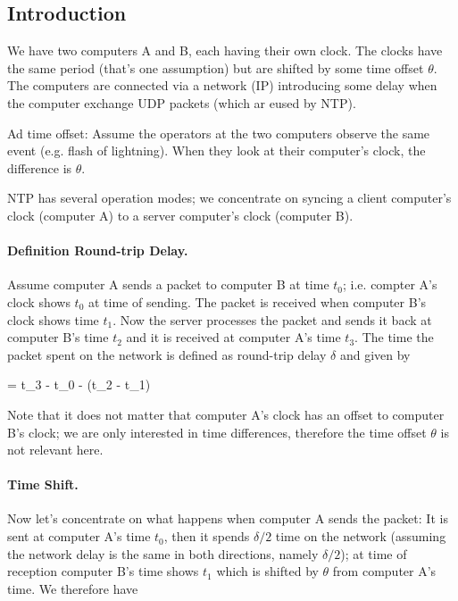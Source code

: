 
\subsection{Introduction}

We have two computers A and B, each having their own clock. The clocks have the same period (that's one assumption) but are shifted by some time offset $\theta$. The computers are connected via a network (IP) introducing some delay when the computer exchange UDP packets (which ar eused by NTP).

Ad time offset: Assume the operators at the two computers observe the same event (e.g. flash of lightning). When they look at their computer's clock, the difference is $\theta$.

NTP has several operation modes; we concentrate on syncing a client computer's clock (computer A) to a server computer's clock (computer B).

\paragraph{Definition Round-trip Delay.} Assume computer A sends a packet to computer B at time $t_0$; i.e. compter A's clock shows $t_0$ at time of sending. The packet is received when computer B's clock shows time $t_1$. Now the server processes the packet and sends it back at computer B's time $t_2$ and it is received at computer A's time $t_3$. The time the packet spent on the network is defined as round-trip delay $\delta$ and given by

\bee
\delta = t_3 - t_0 - (t_2 - t_1)
\eee

Note that it does not matter that computer A's clock has an offset to computer B's clock; we are only interested in time differences, therefore the time offset $\theta$ is not relevant here.

\paragraph{Time Shift.} Now let's concentrate on what happens when computer A sends the packet: It is sent at computer A's time $t_0$, then it spends $\delta/2$ time on the network (assuming the network delay is the same in both directions, namely $\delta/2$); at time of reception computer B's time shows $t_1$ which is shifted by $\theta$ from computer A's time. We therefore have

